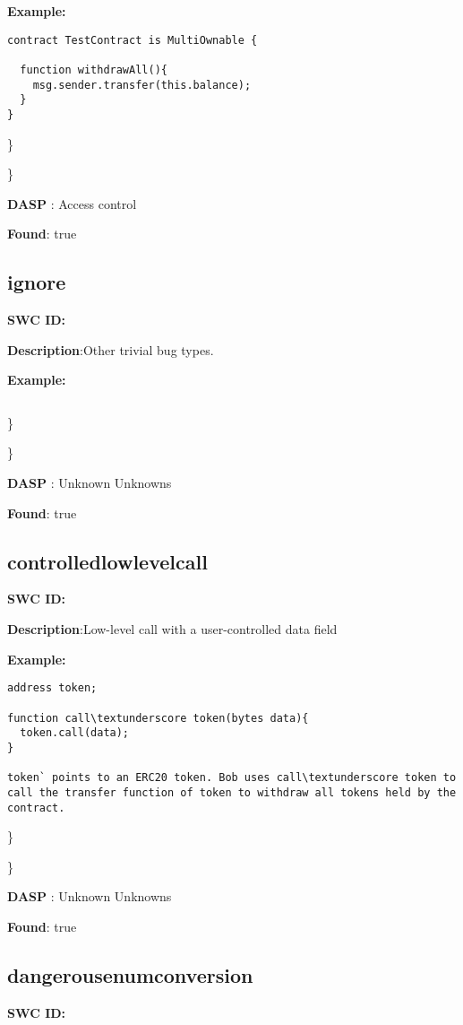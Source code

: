 \documentclass{article}
\begin{document}
\textbf{Example:} 
\begin{verbatim}
contract TestContract is MultiOwnable {

  function withdrawAll(){
    msg.sender.transfer(this.balance);
  }
}

\end{verbatim}\} 

\} 

\textbf{DASP} : Access control

\textbf{Found}: true

\subsection{ignore} 
\textbf{SWC \textunderscore ID:} 

\textbf{Description}:Other trivial bug types.


\textbf{Example:} 
\begin{verbatim}

\end{verbatim}\} 

\} 

\textbf{DASP} : Unknown Unknowns

\textbf{Found}: true

\subsection{controlled\textunderscore lowlevel\textunderscore call} 
\textbf{SWC \textunderscore ID:} 

\textbf{Description}:Low-level call with a user-controlled data field


\textbf{Example:} 
\begin{verbatim}
address token;

function call\textunderscore token(bytes data){
  token.call(data);
}

token` points to an ERC20 token. Bob uses call\textunderscore token to call the transfer function of token to withdraw all tokens held by the contract.

\end{verbatim}\} 

\} 

\textbf{DASP} : Unknown Unknowns

\textbf{Found}: true

\subsection{dangerous\textunderscore enum\textunderscore conversion} 
\textbf{SWC \textunderscore ID:} 
\end{document}
